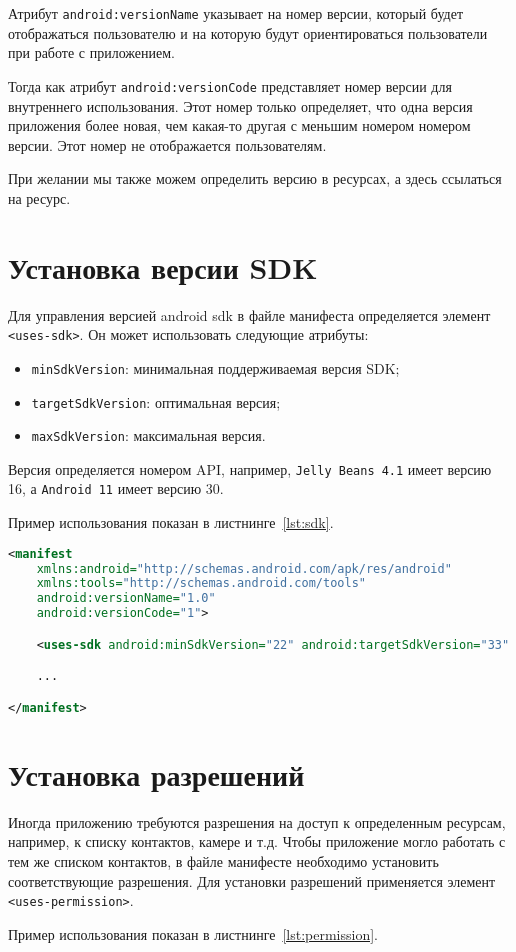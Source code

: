 Атрибут \texttt{android:versionName} указывает на номер версии, который будет
отображаться пользователю и на которую будут ориентироваться
пользователи при работе с приложением.\par
Тогда как атрибут \texttt{android:versionCode} представляет номер версии для
внутреннего использования. Этот номер только определяет, что одна версия
приложения более новая, чем какая-то другая с меньшим номером номером
версии. Этот номер не отображается пользователям.\par
При желании мы также можем определить версию в ресурсах, а здесь
ссылаться на ресурс.

\section{Установка версии SDK}
Для управления версией android sdk в файле манифеста определяется элемент
\texttt{<uses-sdk>}. Он может использовать следующие атрибуты:

\begin{itemize}
	\item \texttt{minSdkVersion}: минимальная поддерживаемая версия SDK;
	\item \texttt{targetSdkVersion}: оптимальная версия;
	\item \texttt{maxSdkVersion}: максимальная версия.
\end{itemize}

Версия определяется номером API, например, \texttt{Jelly Beans 4.1}
имеет версию 16, а \texttt{Android 11} имеет версию 30.\par
Пример использования показан в листнинге~\ref{lst:sdk}.

\begin{lstlisting}[language=XML
	, caption=\leftline{}
	, label=lst:sdk
	]
<manifest
    xmlns:android="http://schemas.android.com/apk/res/android"
    xmlns:tools="http://schemas.android.com/tools"
    android:versionName="1.0"
    android:versionCode="1">

    <uses-sdk android:minSdkVersion="22" android:targetSdkVersion="33" />

	...

</manifest>
\end{lstlisting}

\section{Установка разрешений}
Иногда приложению требуются разрешения на доступ к определенным
ресурсам, например, к списку контактов, камере и т.д. Чтобы приложение
могло работать с тем же списком контактов, в файле манифесте необходимо
установить соответствующие разрешения. Для установки разрешений
применяется элемент \texttt{<uses-permission>}.\par
Пример использования показан в листнинге~\ref{lst:permission}.

